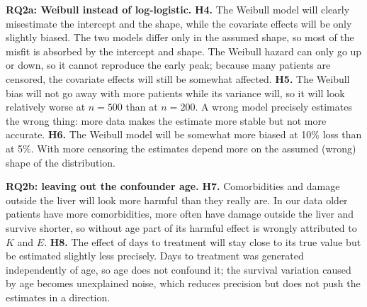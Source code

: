 \documentclass[10pt,a4paper]{article}
\begin{document}
\textbf{RQ2a: Weibull instead of log-logistic.}
\textbf{H4.} The Weibull model will clearly misestimate the intercept and the shape, while the covariate effects will be only slightly biased. The two models differ only in the assumed shape, so most of the misfit is absorbed by the intercept and shape. The Weibull hazard can only go up or down, so it cannot reproduce the early peak; because many patients are censored, the covariate effects will still be somewhat affected.
\textbf{H5.} The Weibull bias will not go away with more patients while its variance will, so it will look relatively worse at $n=500$ than at $n=200$. A wrong model precisely estimates the wrong thing: more data makes the estimate more stable but not more accurate.
\textbf{H6.} The Weibull model will be somewhat more biased at 10\% loss than at 5\%. With more censoring the estimates depend more on the assumed (wrong) shape of the distribution.

\textbf{RQ2b: leaving out the confounder age.}
\textbf{H7.} Comorbidities and damage outside the liver will look more harmful than they really are. In our data older patients have more comorbidities, more often have damage outside the liver and survive shorter, so without age part of its harmful effect is wrongly attributed to $K$ and $E$.
\textbf{H8.} The effect of days to treatment will stay close to its true value but be estimated slightly less precisely. Days to treatment was generated independently of age, so age does not confound it; the survival variation caused by age becomes unexplained noise, which reduces precision but does not push the estimates in a direction.

\newpage
\end{document}
